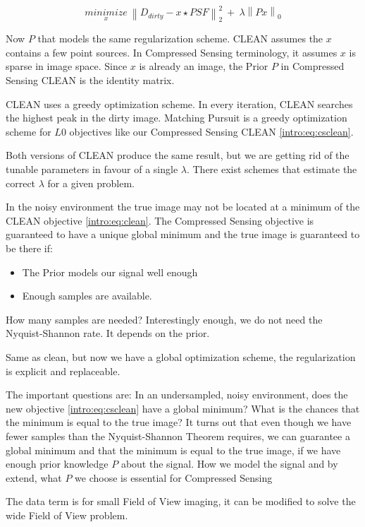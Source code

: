 \begin{equation}\label{intro:eq:csclean}
	\underset{x}{minimize} \: \left \| D_{dirty} - x \star PSF \right \|_2^2 \: + \: \lambda \left \| Px \right \|_0
\end{equation}

Now $P$ that models the same regularization scheme. CLEAN assumes the $x$ contains a few point sources. In Compressed Sensing terminology, it assumes $x$ is sparse in image space. Since $x$ is already an image, the Prior $P$ in Compressed Sensing CLEAN is the identity matrix. 

CLEAN uses a greedy optimization scheme. In every iteration, CLEAN searches the highest peak in the dirty image. Matching Pursuit is a greedy optimization scheme for $L0$ objectives like our Compressed Sensing CLEAN \eqref{intro:eq:csclean}.





Both versions of CLEAN produce the same result, but we are getting rid of the tunable parameters in favour of a single $\lambda$. There exist schemes that estimate the correct $\lambda$ for a given problem.

In the noisy environment the true image may not be located at a minimum of the CLEAN objective \eqref{intro:eq:clean}. The Compressed Sensing objective is guaranteed to have a unique global minimum and the true image is guaranteed to be there if:
\begin{itemize}
	\item The Prior models our signal well enough
	\item Enough samples are available. 
\end{itemize}

How many samples are needed? Interestingly enough, we do not need the Nyquist-Shannon rate. It depends on the prior. 

Same as clean, but now we have a global optimization scheme, the regularization is explicit and replaceable.

The important questions are: In an undersampled, noisy environment, does the new objective \eqref{intro:eq:csclean} have a global minimum? What is the chances that the minimum is equal to the true image? It turns out that even though we have fewer samples than the Nyquist-Shannon Theorem requires, we can guarantee a global minimum and that the minimum is equal to the true image, if we have enough prior knowledge $P$ about the signal. How we model the signal and by extend, what $P$ we choose is essential for Compressed Sensing


The data term is for small Field of View imaging, it can be modified to solve the wide Field of View problem.





